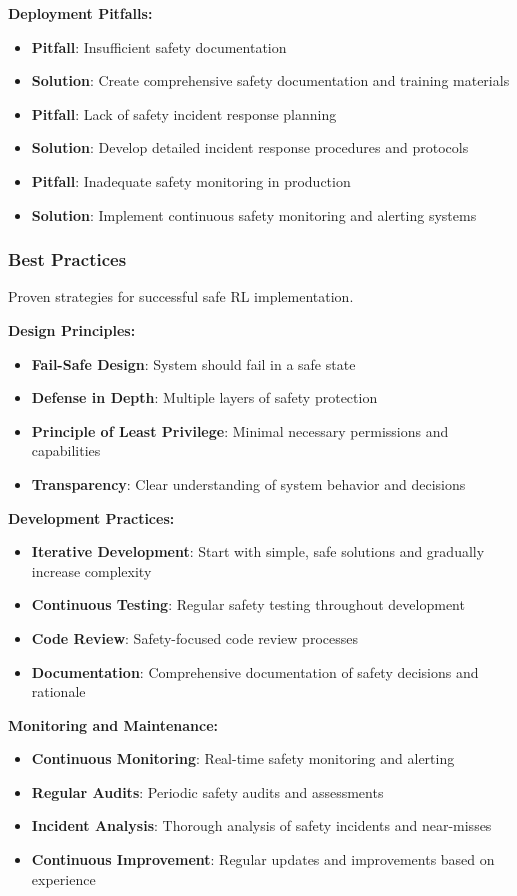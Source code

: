 \documentclass[12pt]{article}
\begin{document}
{{{{\textbf{Deployment Pitfalls:}
\begin{itemize}
\item \textbf{Pitfall}: Insufficient safety documentation
\item \textbf{Solution}: Create comprehensive safety documentation and training materials
\item \textbf{Pitfall}: Lack of safety incident response planning
\item \textbf{Solution}: Develop detailed incident response procedures and protocols
\item \textbf{Pitfall}: Inadequate safety monitoring in production
\item \textbf{Solution}: Implement continuous safety monitoring and alerting systems
\end{itemize}

\subsubsection{Best Practices}

Proven strategies for successful safe RL implementation.

\textbf{Design Principles:}
\begin{itemize}
\item \textbf{Fail-Safe Design}: System should fail in a safe state
\item \textbf{Defense in Depth}: Multiple layers of safety protection
\item \textbf{Principle of Least Privilege}: Minimal necessary permissions and capabilities
\item \textbf{Transparency}: Clear understanding of system behavior and decisions
\end{itemize}

\textbf{Development Practices:}
\begin{itemize}
\item \textbf{Iterative Development}: Start with simple, safe solutions and gradually increase complexity
\item \textbf{Continuous Testing}: Regular safety testing throughout development
\item \textbf{Code Review}: Safety-focused code review processes
\item \textbf{Documentation}: Comprehensive documentation of safety decisions and rationale
\end{itemize}

\textbf{Monitoring and Maintenance:}
\begin{itemize}
\item \textbf{Continuous Monitoring}: Real-time safety monitoring and alerting
\item \textbf{Regular Audits}: Periodic safety audits and assessments
\item \textbf{Incident Analysis}: Thorough analysis of safety incidents and near-misses
\item \textbf{Continuous Improvement}: Regular updates and improvements based on experience
\end{itemize}

}}}}
\end{document}

